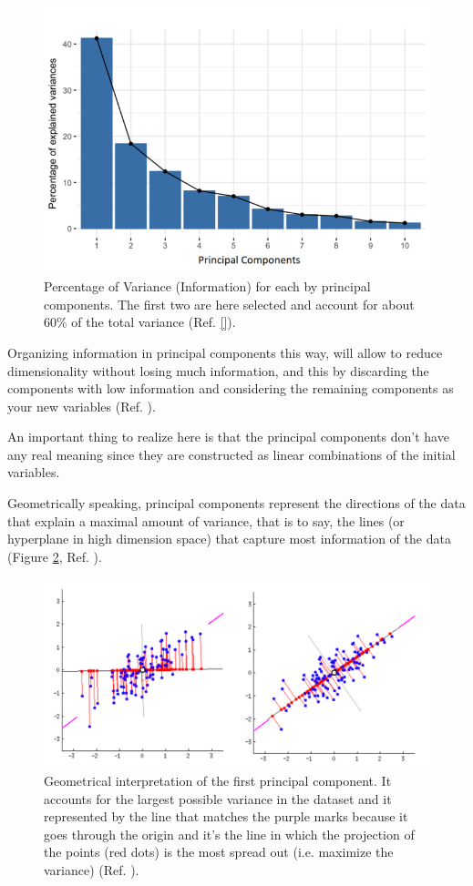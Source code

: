 \documentclass[english,notitlepage,reprint,nofootinbib]{revtex4-1}  %
\begin{document}
\begin{figure}[h]
    \centering 
    \includegraphics[scale=0.3]{img/principal_components.png}
    \caption{Percentage of Variance (Information) for each by principal components. The first two are here selected and account for about $60\%$ of the total variance (Ref. \ref{}).}
    \label{fig:PC}
\end{figure}

Organizing information in principal components this way, will allow to reduce dimensionality without losing much information, and this by discarding the components with low information and considering the remaining components as your new variables (Ref. \cite{pc}).

An important thing to realize here is that the principal components don’t have any real meaning since they are constructed as linear combinations of the initial variables.

Geometrically speaking, principal components represent the directions of the data that explain a maximal amount of variance, that is to say, the lines (or hyperplane in high dimension space) that capture most information of the data (Figure \ref{fig:PC2}, Ref. \cite{mortens}). 


\begin{figure}[h]
    \centering 
    \includegraphics[scale=0.4]{img/PC_2.png}
    \caption{Geometrical interpretation of the first principal component. It accounts for the largest possible variance in the dataset and it represented by the line that matches the purple marks because it goes through the origin and it’s the line in which the projection of the points (red dots) is the most spread out (i.e. maximize the variance) (Ref. \cite{pc}).}
    \label{fig:PC2}
\end{figure}
\end{document}
